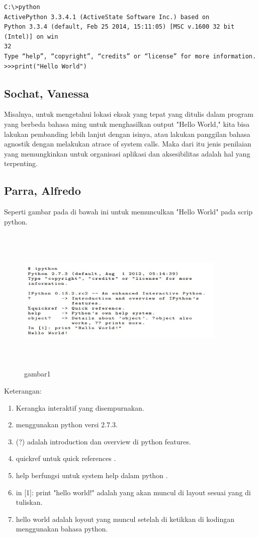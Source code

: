 \documentclass[12pt]{article}
\begin{document}
\begin{verbatim}
C:\>python
ActivePython 3.3.4.1 (ActiveState Software Inc.) based on
Python 3.3.4 (default, Feb 25 2014, 15:11:05) [MSC v.1600 32 bit (Intel)] on win
32
Type “help”, “copyright”, “credits” or “license” for more information.
>>>print("Hello World")

\end{verbatim}

\subsection{Sochat, Vanessa}
Misalnya, untuk mengetahui lokasi eksak yang tepat yang ditulis dalam program yang berbeda bahasa ming untuk menghasilkan output "Hello World," kita bisa lakukan pembanding lebih lanjut dengan isinya, atau lakukan panggilan bahasa agnostik dengan melakukan atrace of system calls. Maka dari itu jenis penilaian yang memungkinkan untuk organisasi aplikasi dan aksesibilitas adalah hal yang terpenting\cite{sochat2018scientific}.

\subsection{Parra, Alfredo}
Seperti gambar pada di bawah ini untuk memunculkan "Hello World" pada scrip python.

\begin{figure}
\begin{center}
\includegraphics[width = 10cm, height= 7cm]{coding.jpg}
\caption{gambar1} 
\end{center}
\end{figure}


Keterangan:
\begin{enumerate}
\item Kerangka interaktif yang disempurnakan.
\item menggunakan python versi 2.7.3.
\item (?) adalah introduction dan overview di python features.
\item quickref untuk quick references .
\item help berfungsi untuk system help dalam python .
\item in [1]: print "hello world!" adalah yang akan muncul di layout sesuai yang di tuliskan.
\item hello world adalah loyout yang muncul setelah di ketikkan di kodingan menggunakan bahasa python.
\end{enumerate}
\end{document}
